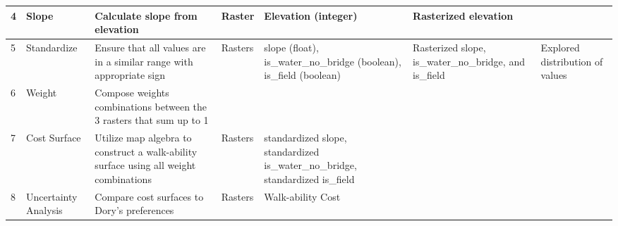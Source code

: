 \documentclass[article,12pt]{article}
\numberwithin{equation}{section}
\begin{document}
{\begin{tabular}{|l|p{.12\linewidth}|p{.2\linewidth}|p{.1\linewidth}|p{.2\linewidth}|p{.2\linewidth}|p{.1\linewidth}|}
		4 & Slope & Calculate slope from elevation               &    Raster                                     &   Elevation (integer)                                                & Rasterized elevation                                                                                                                                                                                                        &             \\ \hline
		5 &  Standardize      & Ensure that all values are in a similar range with appropriate sign                                                           & Rasters         &  slope (float), is\_water\_no\_bridge (boolean), is\_field (boolean)                                               &         Rasterized slope, is\_water\_no\_bridge, and is\_field                                                                                                       &       Explored distribution of values \\ \hline
		6 & Weight                            & Compose weights combinations between the 3 rasters that sum up to 1 &                   &                                                  &                                                                                                                                           &             \\ \hline
		7 & Cost Surface & Utilize map algebra to construct a walk-ability surface using all weight combinations               &  Rasters                                       &  standardized slope, standardized is\_water\_no\_bridge, standardized is\_field                                                 &                                                                                                                                                                                                         &             \\ \hline
		8 & Uncertainty Analysis & Compare cost surfaces to Dory's preferences              &    Rasters                                     &  Walk-ability Cost                                                 &                                                                                                                                                                                                         &             \\ \hline      
	\end{tabular}
}
\end{document}
